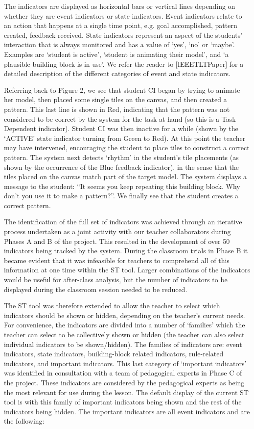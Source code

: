 The indicators are displayed as horizontal bars or vertical lines
depending on whether they are event indicators or state
indicators. Event indicators relate to an action that happens at a
single time point, e.g. goal accomplished, pattern created, feedback
received. State indicators represent an aspect of the students'
interaction that is always monitored and has a value of `yes’, `no’ or
`maybe’.  Examples are `student is active’, `student is animating
their model’, and `a plausible building block is in use’. We refer the
reader to [IEEETLTPaper] for a detailed description of the different
categories of event and state indicators.

Referring back to Figure 2, we see that student CI began by trying to
animate her model, then placed some single tiles on the canvas, and
then created a pattern. This last line is shown in Red, indicating
that the pattern was not considered to be correct by the system for
the task at hand (so this is a Task Dependent indicator). Student CI
was then inactive for a while (shown by the `ACTIVE’ state indicator
turning from Green to Red). At this point the teacher may have
intervened, encouraging the student to place tiles to construct a
correct pattern. The system next detects `rhythm’ in the student’s
tile placements (as shown by the occurrence of the Blue feedback
indicator), in the sense that the tiles placed on the canvas match
part of the target model. The system displays a message to the
student: “It seems you keep repeating this building block. Why don’t
you use it to make a pattern?”. We finally see that the student
creates a correct pattern.
  
The identification of the full set of indicators was achieved through
an iterative process undertaken as a joint activity with our teacher
collaborators during Phases A and B of the project. This resulted in
the development of over 50 indicators being tracked by the
system. During the classroom trials in Phase B it became evident that
it was infeasible for teachers to comprehend all of this information
at one time within the ST tool. Larger combinations of the indicators
would be useful for after-class analysis, but the number of indicators
to be displayed during the classroom session needed to be reduced.

The ST tool was therefore extended to allow the teacher to select
which indicators should be shown or hidden, depending on the teacher’s
current needs. For convenience, the indicators are divided into a
number of `families’ which the teacher can select to be collectively
shown or hidden (the teacher can also select individual indicators to
be shown/hidden). The families of indicators are: event indicators,
state indicators, building-block related indicators, rule-related
indicators, and important indicators. This last category of `important
indicators’ was identified in consultation with a team of pedagogical
experts in Phase C of the project. These indicators are considered by
the pedagogical experts as being the most relevant for use during the
lesson. The default display of the current ST tool is with this family
of important indicators being shown and the rest of the indicators
being hidden.  The important indicators are all event indicators and
are the following:

